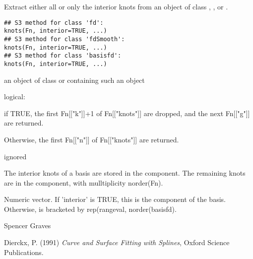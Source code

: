 \begin{Description}\relax
Extract either all or only the interior knots from an object of class
, , or .
\end{Description}
\begin{Usage}
\begin{verbatim}
## S3 method for class 'fd':
knots(Fn, interior=TRUE, ...)
## S3 method for class 'fdSmooth':
knots(Fn, interior=TRUE, ...)
## S3 method for class 'basisfd':
knots(Fn, interior=TRUE, ...)
\end{verbatim}
\end{Usage}
\begin{Arguments}
\begin{ldescription}
\item[\code{Fn}] an object of class  or containing such an object 

\item[\code{interior}] logical:

if TRUE, the first Fn[["k"]]+1 of Fn[["knots"]] are dropped, and the
next Fn[["g"]] are returned.

Otherwise, the first Fn[["n"]] of Fn[["knots"]] are returned.  

\item[\code{...}] ignored
\end{ldescription}
\end{Arguments}
\begin{Details}\relax
The interior knots of a  basis are stored in the
 component.  The remaining knots are in the
 component, with mulltiplicity norder(Fn).
\end{Details}
\begin{Value}
Numeric vector.  If 'interior' is TRUE, this is the 
component of the  basis.  Otherwise,  is
bracketed by rep(rangeval, norder(basisfd).
\end{Value}
\begin{Author}\relax
Spencer Graves
\end{Author}
\begin{References}\relax
Dierckx, P. (1991) \emph{Curve and Surface Fitting with Splines},
Oxford Science Publications.
\end{References}
